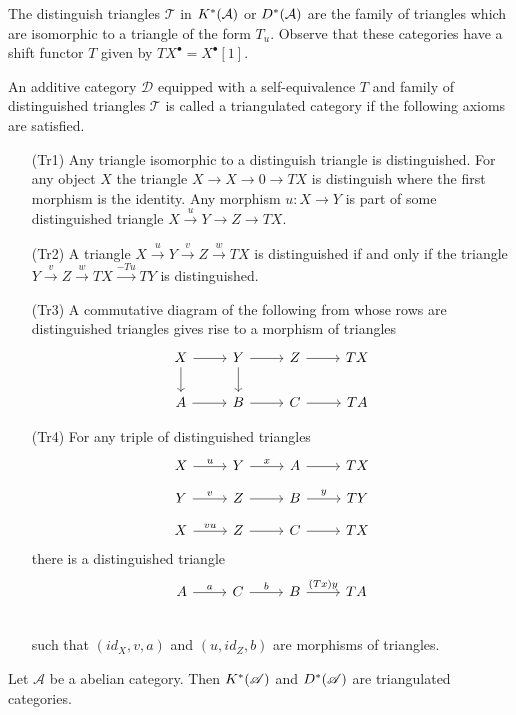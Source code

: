 The distinguish triangles $\mathcal{T}$ in $K^*(\AA)$ or $D^*(\AA)$ are the family of triangles which are isomorphic to a triangle of the form $T_u$.
Observe that these categories have a shift functor $T$ given by $TX^\bullet = X^\bullet[1]$.
\begin{definition}
 An additive category $\mathcal{D}$ equipped with a self-equivalence $T$ and family of distinguished triangles $\mathcal{T}$ is called a triangulated category if the following axioms are satisfied.
 \begin{enumerate}
   \item[(Tr1)] Any triangle isomorphic to a distinguish triangle is distinguished. For any object $X$ the triangle $X\to X \to 0 \to TX$ is distinguish where the first morphism is the identity.
   Any morphism $u:X\to Y$ is part of some distinguished triangle $X\xrightarrow{u} Y \to Z \to TX$.
   \item[(Tr2)] A triangle $X\xrightarrow{u} Y \xrightarrow{v} Z \xrightarrow{w} TX$ is distinguished if and only if the triangle $Y \xrightarrow{v} Z \xrightarrow{w} TX \xrightarrow{-Tu} TY$ is distinguished.
   \item[(Tr3)] A commutative diagram of the following from whose rows are distinguished triangles gives rise to a morphism of triangles
   $$
     \begin{tikzcd}
       X\arrow{d}\rar& Y\arrow{d}\rar & Z\rar & TX\\
       A\rar& B\rar & C\rar & TA
     \end{tikzcd}
    $$
   \item[(Tr4)] For any triple of distinguished triangles
   $$
     \begin{tikzcd}[row sep=small]
       X \arrow{r}{u} & Y \arrow{r}{x}& A \arrow{r}{} & TX \\
       Y \arrow{r}{v} & Z \arrow{r}{}& B \arrow{r}{y} & TY\\
       X \arrow{r}{vu} & Z\arrow{r}{} & C\arrow{r}{} & TX
     \end{tikzcd}
   $$
   there is a distinguished triangle
   $$\begin{tikzcd}
     A \arrow{r}{a} & C \arrow{r}{b}& B \arrow{r}{(Tx)y} & TA \\
   \end{tikzcd} $$
   such that $(id_X, v,a)$ and $(u,id_Z,b)$ are morphisms of triangles.
   \end{enumerate}
\end{definition}
\begin{proposition}
 Let $\mathcal{A}$ be a abelian category. Then $K^*(\A)$ and $D^*(\A)$ are triangulated categories.
\end{proposition}
